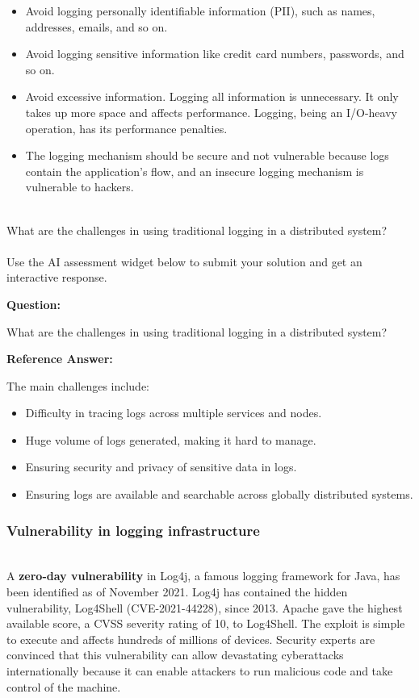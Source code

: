 \begin{itemize}
\item
\protect{}\label{CuxvZuc9CVnMhTO7nDCML}
Avoid logging personally identifiable information (PII), such as names, addresses, emails, and so on.
\item
\protect{}\label{E_bhC60O8TYdFc_SuFQWE}
Avoid logging sensitive information like credit card numbers, passwords, and so on.
\item
\protect{}\label{hRVf7ym_BR9iGhJvS7vlJ}
Avoid excessive information. Logging all information is unnecessary. It only takes up more space and affects performance. Logging, being an I/O-heavy operation, has its performance penalties.
\item
\protect{}\label{tryS21oXUdfExOW9BfycZ}
The logging mechanism should be secure and not vulnerable because logs contain the application's flow, and an insecure logging mechanism is vulnerable to hackers.
\end{itemize}
\\
What are the challenges in using traditional logging in a distributed system?\\
\\
Use the AI assessment widget below to submit your solution and get an interactive response.

\textbf{Question:}

What are the challenges in using traditional logging in a distributed system?

\textbf{Reference Answer:}

The main challenges include:

\begin{itemize}
\tightlist
\item
Difficulty in tracing logs across multiple services and nodes.\\
\item
Huge volume of logs generated, making it hard to manage.\\
\item
Ensuring security and privacy of sensitive data in logs.\\
\item
Ensuring logs are available and searchable across globally distributed systems.
\end{itemize}

\subsubsection{Vulnerability in logging infrastructure}\label{HTa1rm1U31BsQdAoiQuRY}
\\
A \textbf{zero-day vulnerability} in Log4j, a famous logging framework for Java, has been identified as of November 2021. Log4j has contained the hidden vulnerability, Log4Shell (CVE-2021-44228), since 2013. Apache gave the highest available score, a CVSS severity rating of 10, to Log4Shell. The exploit is simple to execute and affects hundreds of millions of devices. Security experts are convinced that this vulnerability can allow devastating cyberattacks internationally because it can enable attackers to run malicious code and take control of the machine.

